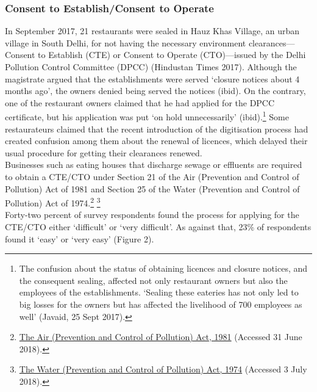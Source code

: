 \documentclass[a4paper, 12pt]{article}
\begin{document}
     
                  
                   \subsubsection{Consent to Establish/Consent to Operate}
                   In September 2017, 21 restaurants were sealed in Hauz Khas Village, an urban village in South Delhi, for not having the necessary environment clearances—Consent to Establish (CTE) or Consent to Operate (CTO)—issued by the Delhi Pollution Control Committee (DPCC) (Hindustan Times 2017). Although the magistrate argued that the establishments were served ‘closure notices about 4 months ago’, the owners denied being served the notices (ibid). On the contrary, one of the restaurant owners claimed that he had applied for the DPCC certificate, but his application was put ‘on hold unnecessarily’ (ibid).\footnote{The confusion about the status of obtaining licences and closure notices, and the consequent sealing, affected not only restaurant owners but also the employees of the establishments. ‘Sealing these eateries has not only led to big losses for the owners but has affected the livelihood of 700 employees as well’ (Javaid, 25 Sept 2017).} Some restaurateurs claimed that the recent introduction of the digitisation process had created confusion among them about the renewal of licences, which delayed their usual procedure for getting their clearances renewed.\\
                   Businesses such as eating houses that discharge sewage or effluents are required to obtain a CTE/CTO under Section 21 of the Air (Prevention and Control of Pollution) Act of 1981 and Section 25 of the Water (Prevention and Control of Pollution) Act of 1974.\footnote{\href{https://bit.ly/2pbaWOw}{The Air (Prevention and Control of Pollution) Act, 1981} (Accessed 31 June 2018).} \footnote{\href{https://bit.ly/2xcUyRW}{The Water (Prevention and Control of Pollution) Act, 1974} (Accessed 3 July 2018).} \\ %
                   Forty-two percent of survey respondents found the process for applying for the CTE/CTO either ‘difficult’ or ‘very difficult’. As against that, 23\% of respondents found it ‘easy’ or ‘very easy’ (Figure 2).
              
\end{document}
